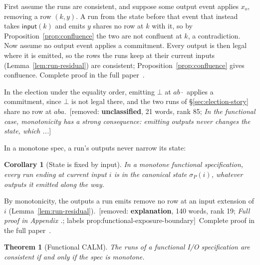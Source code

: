 \documentclass[sigconf]{cidr-2027}
\makeatletter
\newtheorem{theorem}{Theorem}
\newtheorem{corollary}{Corollary}
\theoremstyle{remark}
\newcommand{\commitment}{commitment\xspace}
\newcommand{\spectype}[1][]{I/O specification#1\xspace}
\newcommand{\fullproof}{Complete proof in the full paper~\cite{hellerstein2026completecalmfull}.}
\newif\ifshowrv \showrvfalse
\newcommand{\rv}[1]{\ifshowrv\textsuperscript{\textcolor{magenta}{\textbf{R#1}}}\fi}
\renewenvironment{proof}[1][\proofname]{\par
  \pushQED{\qed}\normalfont\topsep2\p@\relax
  \trivlist\item[\@proofindent\hskip\labelsep{\@proofnamefont #1\@addpunct{.}}]\ignorespaces
}{\popQED\endtrivlist\@endpefalse}
\newcommand{\removednote}[1]{{\color{cutred}\footnotesize\,[removed: #1]\,}}
\makeatother
\begin{document}
\begin{proof}[Proof sketch]
\textcolor{newblue}{First assume the runs are consistent, and suppose some output event applies
$x_o$, removing a row $(k,y)$.\rv{3}  A run from the state before that event that
instead takes $\mathsf{input}(k)$ and emits $y$ shares no row at $k$ with it,
so by Proposition~\ref{prop:confluence} the two are not confluent at $k$, a
contradiction.} \textcolor{newblue}{Now assume no output event applies a \commitment.} \textcolor{newblue}{Every output
is then legal where it is emitted, so the rows the runs keep at their current
inputs (Lemma~\ref{lem:run-residual}) are consistent;
Proposition~\ref{prop:confluence} gives confluence.} \textcolor{newblue}{\fullproof}
\end{proof}

\textcolor{newblue}{In the election under the equality order, emitting $\bot$ at $ab\cdot$ applies
a \commitment, since $\bot$ is not legal there, and the two runs of
\S\ref{sec:election-story} share no row at $aba$.} \removednote{\textbf{unclassified}, 21 words, rank 85; \textit{In the functional case, monotonicity has a strong consequence: emitting outputs never changes the state, which ...}}

\textcolor{newblue}{In a monotone spec, a run's outputs never narrow its state:}

\begin{corollary}[State is fixed by input]
\label{cor:state-by-input}
In a monotone functional specification, every run ending at current
input $i$ is in the canonical state $\sigma_P(i)$, whatever outputs it emitted
along the way.
\end{corollary}
\begin{proof}[Proof sketch]
\textcolor{newblue}{By monotonicity, the outputs a run emits remove no row at an input extension of
$i$ (Lemma~\ref{lem:run-residual}).} \removednote{\textbf{explanation}, 140 words, rank 19; \textit{Full proof in Appendix .}; labels prop:functional-exposure-boundary} \textcolor{newblue}{\fullproof}
\end{proof}

\begin{theorem}[Functional CALM]
\label{thm:functional-calm}
The runs of a functional \spectype are consistent if and only if the spec is
monotone.
\end{theorem}
\end{document}
